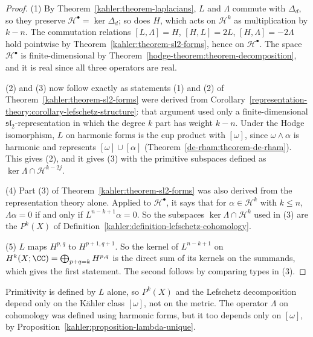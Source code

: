 \begin{proof}
(1) By Theorem~\ref{kahler:theorem-laplacians}, $L$ and $\Lambda$ commute with $\Delta_d$, so they preserve
$\mathcal{H}^\bullet = \ker\Delta_d$; so does $H$, which acts on $\mathcal{H}^k$ as multiplication by $k - n$. The commutation relations
$[L, \Lambda] = H$, $[H, L] = 2L$, $[H, \Lambda] = -2\Lambda$ hold pointwise by Theorem~\ref{kahler:theorem-sl2-forms}, hence on
$\mathcal{H}^\bullet$. The space $\mathcal{H}^\bullet$ is finite-dimensional by Theorem~\ref{hodge-theorem:theorem-decomposition}, and it
is real since all three operators are real.

(2) and (3) now follow exactly as statements (1) and (2) of Theorem~\ref{kahler:theorem-sl2-forms} were derived from
Corollary~\ref{representation-theory:corollary-lefschetz-structure}: that argument used only a finite-dimensional
$\mathfrak{sl}_2$-representation in which the degree $k$ part has weight $k - n$. Under the Hodge isomorphism, $L$ on harmonic forms
is the cup product with $[\omega]$, since $\omega \wedge \alpha$ is harmonic and represents $[\omega] \cup [\alpha]$
(Theorem~\ref{de-rham:theorem-de-rham}). This gives (2), and it gives (3) with the primitive subspaces defined as
$\ker\Lambda \cap \mathcal{H}^{k-2j}$.

(4) Part (3) of Theorem~\ref{kahler:theorem-sl2-forms} was also derived from the representation theory alone. Applied to
$\mathcal{H}^\bullet$, it says that for $\alpha \in \mathcal{H}^k$ with $k \leq n$, $\Lambda\alpha = 0$ if and only if
$L^{n-k+1}\alpha = 0$. So the subspaces $\ker\Lambda \cap \mathcal{H}^k$ used in (3) are the $P^k(X)$ of
Definition~\ref{kahler:definition-lefschetz-cohomology}.

(5) $L$ maps $H^{p,q}$ to $H^{p+1,q+1}$. So the kernel of $L^{n-k+1}$ on $H^k(X; \CC) = \bigoplus_{p+q=k}H^{p,q}$ is the direct sum of
its kernels on the summands, which gives the first statement. The second follows by comparing types in (3).
\end{proof}

\begin{remark}\label{kahler:remark-metric-independence}
Primitivity is defined by $L$ alone, so $P^k(X)$ and the Lefschetz decomposition depend only on the K\"ahler class $[\omega]$, not on the
metric. The operator $\Lambda$ on cohomology was defined using harmonic forms, but it too depends only on $[\omega]$, by
Proposition~\ref{kahler:proposition-lambda-unique}.
\end{remark}

